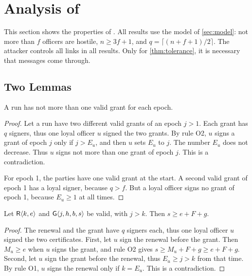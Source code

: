\section{Analysis of \sys{}}
\label{sec:analysis}

This section shows the properties of \sys{}. All results use the model of \cref{sec:model}:
not more than $f$ officers are hostile, $n \ge 3f + 1$, and
$q = \lceil (n + f + 1)/2 \rceil$. The attacker controls all links in all results. Only for
\cref{thm:tolerance}, it is necessary that messages come through.

\subsection{Two Lemmas}

\begin{lem}
\label{lem:grant}
A run has not more than one valid grant for each epoch.
\end{lem}

\begin{proof}
Let a run have two different valid grants of an epoch $j > 1$. Each grant has $q$ signers,
thus one loyal officer $u$ signed the two grants. By rule O2, $u$ signs a grant of epoch
$j$ only if $j > E_u$, and then $u$ sets $E_u$ to $j$. The number $E_u$ does not decrease.
Thus $u$ signs not more than one grant of epoch $j$. This is a contradiction.

For epoch 1, the parties have one valid grant at the start. A second valid grant of epoch 1
has a loyal signer, because $q > f$. But a loyal officer signs no grant of epoch 1, because
$E_u \ge 1$ at all times.
\end{proof}

\begin{lem}[Separation]
\label{lem:separation}
Let $\mathsf{R}\langle k,e\rangle$ and $\mathsf{G}\langle j,h,b,s\rangle$ be valid, with $j > k$. Then $s \ge e + F + g$.
\end{lem}

\begin{proof}
The renewal and the grant have $q$ signers each, thus one loyal officer $u$ signed the two
certificates. First, let $u$ sign the renewal before the grant. Then $M_u \ge e$ when $u$
signs the grant, and rule O2 gives $s \ge M_u + F + g \ge e + F + g$. Second, let $u$ sign
the grant before the renewal, thus $E_u \ge j > k$ from that time. By rule O1, $u$ signs
the renewal only if $k = E_u$. This is a contradiction.
\end{proof}


